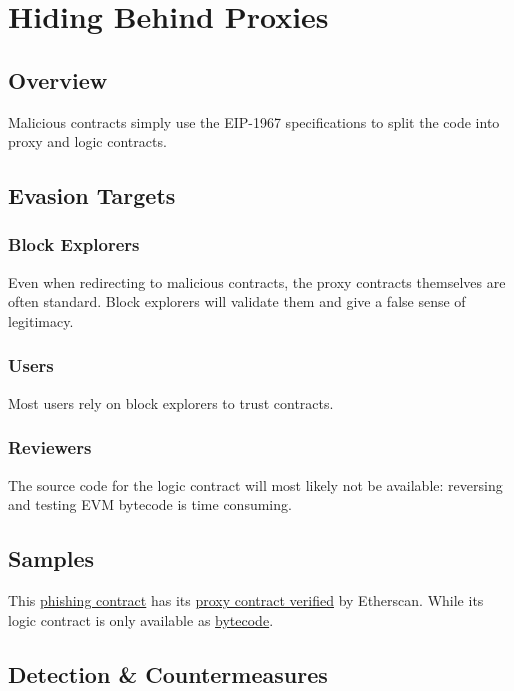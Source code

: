 \section{Hiding Behind Proxies} \label{sec:hiding-behind-proxies}

\subsection{Overview}

Malicious contracts simply use the EIP-1967 \cite{eip-1967} specifications to split the code into proxy and logic contracts.

\subsection{Evasion Targets}

\subsubsection{Block Explorers}

Even when redirecting to malicious contracts, the proxy contracts themselves are often standard.
Block explorers will validate them and give a false sense of legitimacy.

\subsubsection{Users}

Most users rely on block explorers to trust contracts.

\subsubsection{Reviewers}

The source code for the logic contract will most likely not be available:
reversing and testing EVM bytecode is time consuming.

\subsection{Samples}

This \href{}{phishing contract} has its \href{}{proxy contract verified} by Etherscan.
While its logic contract is only available as \href{}{bytecode}.

\subsection{Detection \& Countermeasures}

